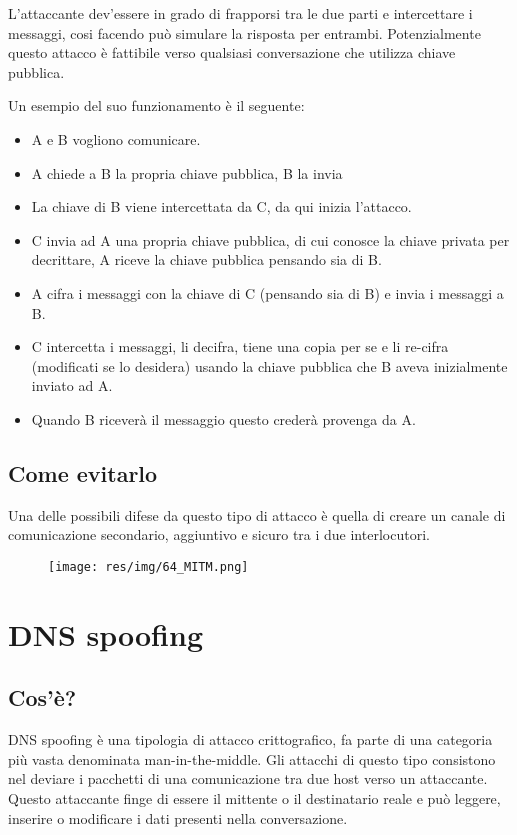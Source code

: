 L'attaccante dev'essere in grado di frapporsi tra le due parti e intercettare i messaggi, cosi facendo può simulare la risposta per entrambi.
Potenzialmente questo attacco è fattibile verso qualsiasi conversazione che utilizza chiave pubblica.


Un esempio del suo funzionamento è il seguente:
\begin{itemize}
\item	A e B vogliono comunicare.
\item	A chiede a B la propria chiave pubblica, B la invia
\item	La chiave di B viene intercettata da C, da qui inizia l'attacco.
\item	C invia ad A una propria chiave pubblica, di cui conosce la chiave privata per decrittare, A riceve la chiave pubblica pensando sia di B.
\item	A cifra i messaggi con la chiave di C (pensando sia di B) e invia i messaggi a B.
\item	C intercetta i messaggi, li decifra, tiene una copia per se e li re-cifra (modificati se lo desidera) usando la chiave pubblica che B aveva inizialmente inviato ad A.
\item	Quando B riceverà il messaggio questo crederà provenga da A.
\end{itemize}

\subsection{Come evitarlo}
Una delle possibili difese da questo tipo di attacco è quella di creare un canale di comunicazione secondario, aggiuntivo e sicuro tra i due interlocutori.

\begin{figure}[H]
\centering
\texttt{[image: res/img/64\_MITM.png]}
\end{figure}


\section{DNS spoofing}
\subsection{Cos'è?}
DNS spoofing è una tipologia di attacco crittografico, fa parte di una categoria più vasta denominata man-in-the-middle. Gli attacchi di questo tipo consistono nel deviare i pacchetti di una comunicazione tra due host verso un attaccante. Questo attaccante finge di essere il mittente o il destinatario reale e può leggere, inserire o modificare i dati presenti nella conversazione.

